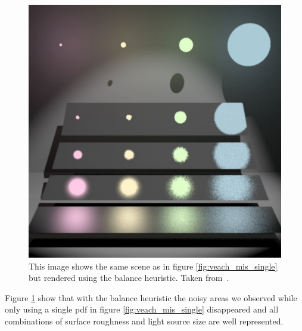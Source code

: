 \begin{figure}[h]
    \centering
    \includegraphics[width=.45\textwidth]{images/veach_mis_both.png}
    \caption{This image shows the same scene as in figure \ref{fig:veach_mis_single} but rendered using the balance heuristic. Taken from~\cite[Figure~9.4]{veach-thesis}.}
    \label{fig:veach_mis_balance}
\end{figure}

Figure \ref{fig:veach_mis_balance} show that with the balance heuristic the noisy areas we observed
while only using a single pdf in figure \ref{fig:veach_mis_single} disappeared
and all combinations of surface roughness and light source size are well represented.